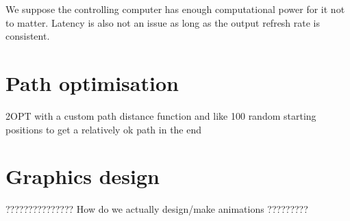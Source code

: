 \documentclass[12pt]{article}
\begin{document}
We suppose the controlling computer has enough computational power for it not to matter. Latency is also not an issue as long as the output refresh rate is consistent.

\section{Path optimisation}

2OPT with a custom path distance function and like 100 random starting positions to get a relatively ok path in the end

\section{Graphics design}

??????????????? How do we actually design/make animations ?????????
\end{document}
